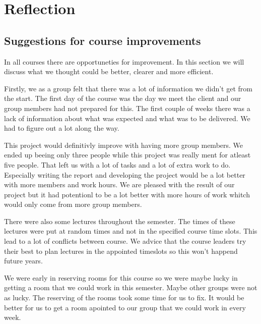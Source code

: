 
\chapter{Reflection}

\section{Suggestions for course improvements}
In all courses there are opportuneties for improvement.
In this section we will discuss what we thought could be better, clearer and more efficient.

Firstly, we as a group felt that there was a lot of information we didn't get from the start. 
The first day of the course was the day we meet the client and our group members had not prepared for this.
The first couple of weeks there was a lack of information about what was expected and what was to be delivered.
We had to figure out a lot along the way.

This project would definitivly improve with having more group members. 
We ended up beeing only three people while this project was really ment for atleast five people.
That left us with a lot of tasks and a lot of extra work to do.
Especially writing the report and developing the project would be a lot better with more members and work hours. 
We are pleased with the result of our project but it had potentionl to be a lot better with more hours of work whitch would only come from more group members. 

There were also some lectures throughout the semester. 
The times of these lectures were put at random times and not in the specified course time slots.
This lead to a lot of conflicts between course.
We advice that the course leaders try their best to plan lectures in the appointed timeslots so this won't happend future years. 

We were early in reserving rooms for this course so we were maybe lucky in getting a room that we could work in this semester. 
Maybe other groups were not as lucky. 
The reserving of the rooms took some time for us to fix. 
It would be better for us to get a room apointed to our group that we could work in every week. 